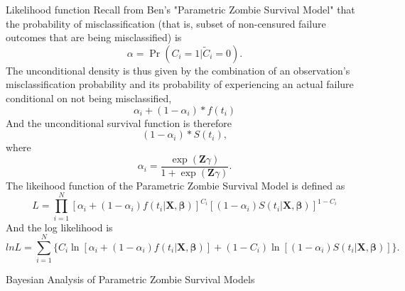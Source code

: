 \documentclass[a4paper, 12pt]{article}
\makeatletter
\newcommand {\dsum}{\displaystyle \sum}
\newcommand {\dprod}{\displaystyle \prod}
\renewcommand{\section}{\@startsection
	{section}    {1}    {0mm}    {-0.7\baselineskip}    {0.08\baselineskip}    {\normalfont\large\sc\center\bf}}
\renewcommand{\subsection}{\@startsection
	{subsection}    {2}    {0mm}    {-0.5\baselineskip}    {0.01\baselineskip}    {\normalfont\normalsize\itshape\center}}
\makeatother
\begin{document}
\subsection{Likelihood function}
\noindent Recall from Ben's "Parametric Zombie Survival Model" that the
probability of misclassification (that is, subset of non-censured failure
outcomes that are being misclassified) is%
\begin{equation}
\alpha =\Pr (C_{i}=1|\widetilde{C}_{i}=0).
\end{equation}
The unconditional density is thus given by the combination of an
observation's misclassification probability and its probability of
experiencing an actual failure conditional on not being misclassified,%
\begin{equation}
\alpha _{i}+(1-\alpha _{i})\ast f(t_{i})
\end{equation}
And the unconditional survival function is therefore%
\begin{equation}
(1-\alpha _{i})\ast S(t_{i}),
\end{equation}
where
\begin{equation}
\alpha _{i}=\frac{\exp (\mathbf{Z}\gamma )}{1+\exp (\mathbf{Z}\gamma )}.
\end{equation}
The likeihood function of the Parametric Zombie Survival Model is defined as 
\begin{equation}
L=\dprod\limits_{i=1}^{N}[\alpha _{i}+(1-\alpha _{i})f(t_{i}|\mathbf{X},\mathbf{\beta}
)]^{C_{i}}[(1-\alpha _{i})S(t_{i}|\mathbf{X,}\mathbf{\beta})]^{1-C_{i}}
\end{equation}
And the log likelihood is%
\begin{equation}
lnL=\dsum\limits_{i=1}^{N}\{C_{i}\ln [\alpha _{i}+(1-\alpha
_{i})f(t_{i}|\mathbf{X},\mathbf{\beta})]+(1-C_{i})\ln [(1-\alpha _{i})S(t_{i}|\mathbf{X,}%
\mathbf{\beta})]\}.
\end{equation}
\iffalse
Equivalently, if define $\delta = 1 - \alpha$ and substitute this quantity into Equation (6), the log-likelihood would be defined as:
\begin{equation}
lnL=\dsum\limits_{i=1}^{N}\{C_{i}\ln [(1-\delta _{i})+\delta
_{i}f(t_{i}|\mathbf{X},\mathbf{\beta})]+(1-C_{i})\ln [\delta _{i}S(t_{i}|\mathbf{X,}%
\mathbf{\beta})]\},
\end{equation}
which is symmetric to the log likelihood of the cure (i.e., split-population) survival model.
\fi
\section{Bayesian Analysis of Parametric Zombie Survival Models}
\iffalse\noindent The parametric survival models, also known as accelerated failure time models (AFT models), includes exponential, log-normal, log-logistic, and Weibull distributions. Although the classical approach is the maximum likelihood for parameter estimation, here we use Bayesian analysis to model Exponential and Weibull cases.\fi
\end{document}
